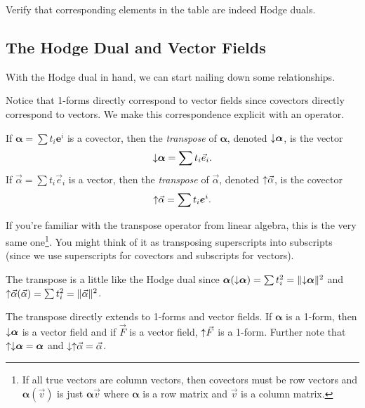 \begin{exercise}
	Verify that corresponding elements in the table are indeed Hodge duals.
\end{exercise}

\subsection{The Hodge Dual and Vector Fields}
With the Hodge dual in hand, we can start nailing down some relationships.

Notice that 1-forms directly correspond to vector fields since covectors directly
correspond to vectors.  We make this correspondence explicit with an operator.
\begin{definition}[Transpose]
	If $\bm\alpha = \sum t_i\bm e^i$ is a covector, then the \emph{transpose}
	of $\bm\alpha$, denoted $\operatorname{\downarrow\!} \bm\alpha$, is the vector
	\[
		\operatorname{\downarrow\!} \bm\alpha = \sum t_i \vec e_i.
	\]
	If $\vec \alpha=\sum t_i\vec e_i$ is a vector, then the \emph{transpose}
	of $\vec \alpha$, denoted $\operatorname{\uparrow\!}\vec \alpha$, is the covector
	\[
		\operatorname{\uparrow\!} \vec\alpha = \sum t_i \bm e^i.
	\]
\end{definition}
If you're familiar with the transpose operator from linear algebra, this is
the very same one\footnote{
	If all true vectors are column vectors, then covectors must be row vectors
	and $\bm\alpha(\vec v)$ is just $\bm\alpha\vec v$ where $\bm\alpha$ is a row
	matrix and $\vec v$ is a column matrix.
}.  You might think of it as transposing superscripts into subscripts (since we use
superscripts for covectors and subscripts for vectors).

The transpose is a little like the Hodge dual since $\bm\alpha(\operatorname{\downarrow\!} \bm\alpha ) =
\sum t_i^2 = \lVert\operatorname{\downarrow\!} \bm\alpha\rVert^2$ and $\operatorname{\uparrow\!}\vec \alpha(\vec \alpha) = \sum t_i^2=\lVert\vec \alpha\rVert^2$.

The transpose directly extends to 1-forms and vector fields.  
If $\bm\alpha$ is a 1-form, then $\operatorname{\downarrow\!}\bm\alpha$ is a vector field and if $\vec F$
is a vector field, $\operatorname{\uparrow\!} \vec F$ is a 1-form.  Further note that $\operatorname{\uparrow\!}\operatorname{\downarrow\!} \bm\alpha = \bm\alpha$
and $\operatorname{\downarrow\!}\operatorname{\uparrow\!}\vec\alpha=\vec \alpha$.

